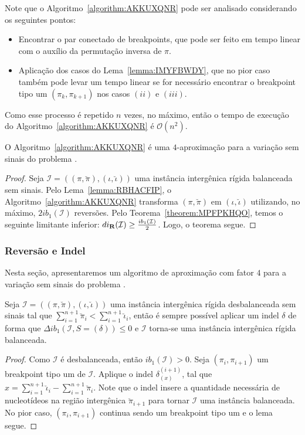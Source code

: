 Note que o Algoritmo~\ref{algorithm:AKKUXQNR} pode ser analisado considerando os seguintes pontos: 
\begin{itemize}
  \item Encontrar o par conectado de breakpoints, que pode ser feito em tempo linear com o auxílio da permutação inversa de $\pi$.
  \item Aplicação dos casos do Lema~\ref{lemma:IMYFBWDY}, que no pior caso também pode levar um tempo linear se for necessário encontrar o breakpoint tipo um $(\pi_k,\pi_{k+1})$ nos casos $(ii)$ e $(iii)$. 
\end{itemize}

Como esse processo é repetido $n$ vezes, no máximo, então o tempo de execução do Algoritmo~\ref{algorithm:AKKUXQNR} é $\mathcal{O}(n^2)$.

\begin{theorem}\label{theorem:BLJAGNDZ}
O Algoritmo~\ref{algorithm:AKKUXQNR} é uma $4$-aproximação para a variação sem sinais do problema \SbIR{}.
\end{theorem}
\begin{proof}
Seja $\mathcal{I}=((\pi,\breve\pi),(\iota,\breve\iota))$ uma instância intergênica rígida balanceada sem sinais. Pelo Lema~\ref{lemma:RBHACFIP}, o Algoritmo~\ref{algorithm:AKKUXQNR} transforma $(\pi,\breve\pi)$ em $(\iota,\breve\iota)$ utilizando, no máximo, $2ib_1(\mathcal{I})$ reversões. Pelo Teorema~\ref{theorem:MPFPKHQO}, temos o seguinte limitante inferior: $di_{\textbf{R}}(\mathcal{I}) \ge \frac{ib_1(\mathcal{I})}{2}$. Logo, o teorema segue. 
\end{proof}

\subsubsection{Reversão e Indel}

Nesta seção, apresentaremos um algoritmo de aproximação com fator $4$ para a variação sem sinais do problema \SbIRI{}.

\begin{lemma}\label{lemma:QGOIQLZD}
Seja $\mathcal{I}=((\pi,\breve\pi),(\iota,\breve\iota))$ uma instância intergênica rígida desbalanceada sem sinais tal que $\sum_{i=1}^{n+1}\breve\pi_i < \sum_{i=1}^{n+1}\breve\iota_i$, então é sempre possível aplicar um indel $\delta$ de forma que $\Delta ib_1(\mathcal{I}, S=(\delta)) \le 0$ e $\mathcal{I}$ torna-se uma instância intergênica rígida balanceada.
\end{lemma}
\begin{proof}
Como $\mathcal{I}$ é desbalanceada, então $ib_1(\mathcal{I}) > 0$. Seja $(\pi_i,\pi_{i+1})$ um breakpoint tipo um de $\mathcal{I}$. Aplique o indel $\delta_{(x)}^{(i+1)}$, tal que $x = \sum_{i=1}^{n+1}\breve\iota_i - \sum_{i=1}^{n+1}\breve\pi_i$. Note que o indel insere a quantidade necessária de nucleotídeos na região intergênica $\breve\pi_{i+1}$ para tornar $\mathcal{I}$ uma instância balanceada. No pior caso, $(\pi_i,\pi_{i+1})$ continua sendo um breakpoint tipo um e o lema segue.
\end{proof}

